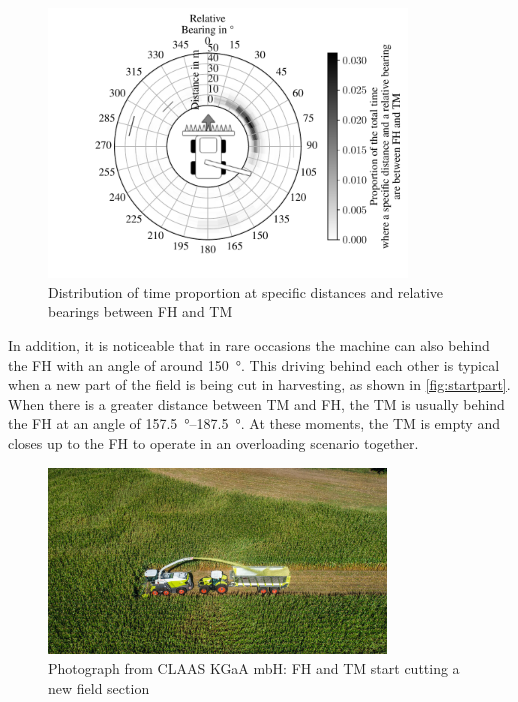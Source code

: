 \begin{figure}[H]
   \centering
   \includegraphics[width=0.85\textwidth]{figures/bearingHarvestScenario50.pdf}
   \caption{Distribution of time proportion at specific distances and relative bearings between \acf{FH} and \acf{TM}}%
   \label{fig:bearing}%
\end{figure}

In addition, it is noticeable that in rare occasions the machine can also behind the \ac{FH} with an angle of around \SI{150}{\degree}.
This driving behind each other is typical when a new part of the field is being cut in harvesting,
as shown in \autoref{fig:startpart}.
When there is a greater distance between \ac{TM} and \ac{FH}, the \ac{TM} is usually behind the FH at an angle of
\SIrange{157.5}{187.5}{\degree}.
At these moments, the \ac{TM} is empty and closes up to the \ac{FH} to operate in an overloading scenario together.

\begin{figure}%
   \centering
   \includegraphics[width=0.8\textwidth]{figures/claas_harvest_behind}
   \caption{Photograph from CLAAS KGaA mbH: \acf{FH} and \acf{TM} start cutting a new field section}%
   \label{fig:startpart}%
\end{figure}


